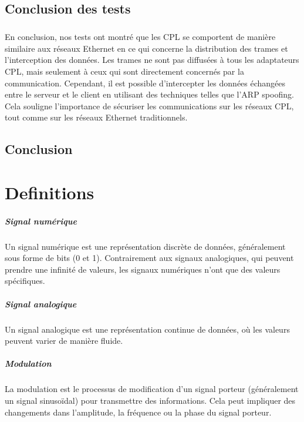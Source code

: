 \documentclass[a4paper,twocolumn]{report}
\begin{document}
\section{Conclusion des tests}
\paragraph{}En conclusion, nos tests ont montré que les CPL se comportent de manière similaire aux réseaux Ethernet en ce qui concerne la distribution des trames et l'interception des données. Les trames ne sont pas diffusées à tous les adaptateurs CPL, mais seulement à ceux qui sont directement concernés par la communication. Cependant, il est possible d'intercepter les données échangées entre le serveur et le client en utilisant des techniques telles que l'ARP spoofing. Cela souligne l'importance de sécuriser les communications sur les réseaux CPL, tout comme sur les réseaux Ethernet traditionnels.

\section{Conclusion}





\appendix
\chapter{Definitions}
\paragraph{Signal numérique} Un signal numérique est une représentation discrète de données, généralement sous forme de bits (0 et 1). Contrairement aux signaux analogiques, qui peuvent prendre une infinité de valeurs, les signaux numériques n'ont que des valeurs spécifiques.
\paragraph{Signal analogique} Un signal analogique est une représentation continue de données, où les valeurs peuvent varier de manière fluide.
\paragraph{Modulation} La modulation est le processus de modification d'un signal porteur (généralement un signal sinusoïdal) pour transmettre des informations. Cela peut impliquer des changements dans l'amplitude, la fréquence ou la phase du signal porteur.
\end{document}
